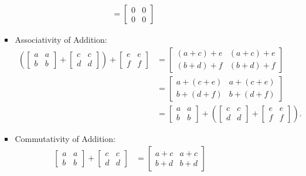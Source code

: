 \documentclass[11pt]{article}
\begin{document}
\begin{enumerate}
\begin{enumerate}
\begin{description}
\begin{itemize}
\begin{align*}
                            &= \begin{bmatrix}0&0\\0&0\end{bmatrix}
          \end{align*}
        \item Associativity of Addition:
          \begin{align*}
            \left(\begin{bmatrix}a&a\\b&b\end{bmatrix} + \begin{bmatrix}c&c\\d&d\end{bmatrix}\right) + \begin{bmatrix}e&e\\f&f\end{bmatrix} &= \begin{bmatrix}(a+c)+e & (a+c)+e\\(b+d)+f & (b+d)+f\end{bmatrix}\\
                                  &= \begin{bmatrix}a+(c+e) & a+(c+e)\\b+(d+f) & b+(d+f)\end{bmatrix}\\
                                  &= \begin{bmatrix}a&a\\b&b\end{bmatrix} + \left( \begin{bmatrix}c&c\\d&d\end{bmatrix} + \begin{bmatrix}e&e\\f&f\end{bmatrix}\right).
          \end{align*}
        \item Commutativity of Addition:
          \begin{align*}
            \begin{bmatrix}a&a\\b&b\end{bmatrix} + \begin{bmatrix}c&c\\d&d\end{bmatrix} &= \begin{bmatrix}a+c&a+c\\b+d&b+d\end{bmatrix}\\

\end{align*}
\end{itemize}
\end{description}
\end{enumerate}
\end{enumerate}
\end{document}
